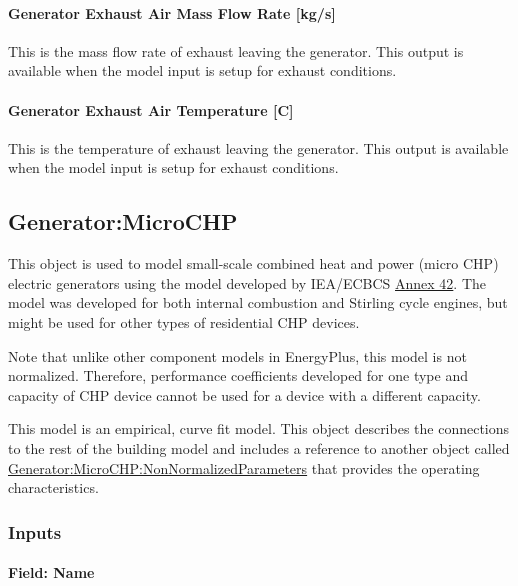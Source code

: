 \paragraph{Generator Exhaust Air Mass Flow Rate {[}kg/s{]}}\label{generator-exhaust-air-mass-flow-rate-kgs}

This is the mass flow rate of exhaust leaving the generator. This output is available when the model input is setup for exhaust conditions.

\paragraph{Generator Exhaust Air Temperature {[}C{]}}\label{generator-exhaust-air-temperature-c-1}

This is the temperature of exhaust leaving the generator. This output is available when the model input is setup for exhaust conditions.

\subsection{Generator:MicroCHP}\label{generatormicrochp}

This object is used to model small-scale combined heat and power (micro CHP) electric generators using the model developed by IEA/ECBCS \href{http://www.ecbcs.org/annexes/annex42.htm}{Annex 42}. The model was developed for both internal combustion and Stirling cycle engines, but might be used for other types of residential CHP devices.

Note that unlike other component models in EnergyPlus, this model is not normalized. Therefore, performance coefficients developed for one type and capacity of CHP device cannot be used for a device with a different capacity.

This model is an empirical, curve fit model. This object describes the connections to the rest of the building model and includes a reference to another object called \hyperref[generatormicrochpnonnormalizedparameters]{Generator:MicroCHP:NonNormalizedParameters} that provides the operating characteristics.

\subsubsection{Inputs}\label{inputs-10-003}

\paragraph{Field: Name}\label{field-name-11-003}

